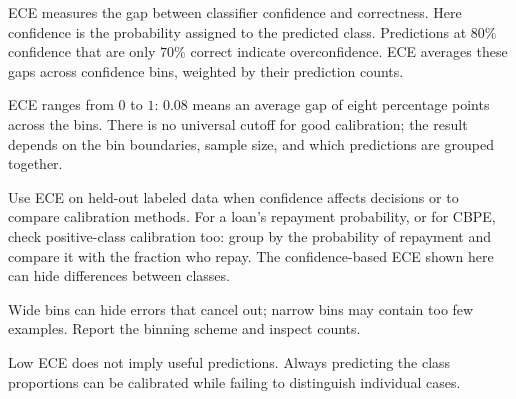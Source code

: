 \clearpage
\thispagestyle{probabilisticstyle}
\label{sec:ece}


ECE measures the gap between classifier confidence and correctness. Here confidence is the probability assigned to the predicted class. Predictions at $80\%$ confidence that are only $70\%$ correct indicate overconfidence. ECE averages these gaps across confidence bins, weighted by their prediction counts.

\begin{metricformula}
\end{metricformula}

ECE ranges from $0$ to $1$: $0.08$ means an average gap of eight percentage points across the bins. There is no universal cutoff
for good calibration; the result depends on the bin boundaries, sample size, and which predictions are grouped together.


Use ECE on held-out labeled data when confidence affects decisions or to compare calibration methods. For a loan's repayment
probability, or for CBPE, check positive-class calibration too: group by the probability of repayment and compare it with the fraction who repay.
The confidence-based ECE shown here can hide differences between classes.


{
\item Wide bins can hide errors that cancel out; narrow bins may contain too few examples. Report the binning scheme and inspect counts.
\item Low ECE does not imply useful predictions. Always predicting the class proportions can be calibrated while failing to distinguish individual cases.
}

